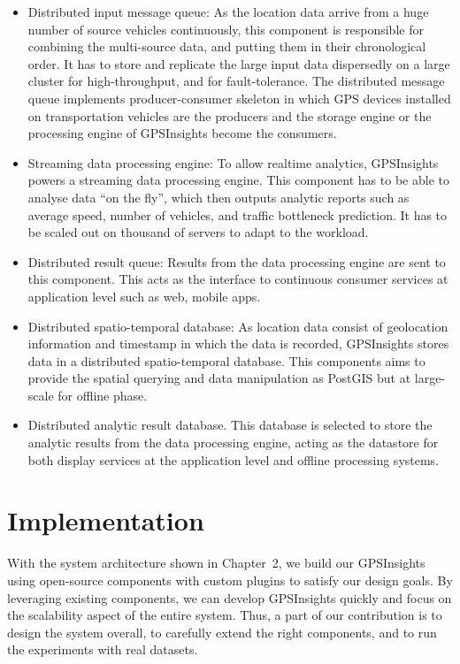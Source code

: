 \documentclass{acm_proc_article-sp}
\begin{document}
\begin{itemize}
\item 	Distributed input message queue: As the location data arrive from a huge number of source vehicles continuously, this component is responsible for combining the multi-source data, and putting them in their chronological order. It has to store and replicate the large input data dispersedly on a large cluster for high-throughput, and for fault-tolerance. The distributed message queue implements producer-consumer skeleton in which GPS devices installed on transportation vehicles are the producers and the storage engine or the processing engine of GPSInsights become the consumers.

\item  Streaming data processing engine: To allow realtime analytics, GPSInsights powers a streaming data processing engine. This component has to be able to analyse data ``on the fly'', which then outputs analytic reports such as average speed, number of vehicles, and traffic bottleneck prediction. It has to be scaled out on thousand of servers to adapt to the workload.

\item  Distributed result queue: Results from the data processing engine are sent to this component. This acts as the interface to continuous consumer services at application level such as web, mobile apps. 

\item  Distributed spatio-temporal database: As location data consist of geolocation information and timestamp in which the data is recorded, GPSInsights stores data in a distributed spatio-temporal database. This components aims to provide the spatial querying and data manipulation as PostGIS but at large-scale for offline phase. 

\item  Distributed analytic result database. This database is selected to store the analytic results from the data processing engine, acting as the datastore for both display services at the application level and offline processing systems. 

\end{itemize}


\section{Implementation} 

With the system architecture shown in Chapter~2, we build our GPSInsights using open-source components with custom plugins to satisfy our design goals. By leveraging existing components, we can develop GPSInsights quickly and focus on the scalability aspect of the entire system. Thus, a part of our contribution is to design the system overall, to carefully extend the right components, and to run the experiments with real datasets.  
\end{document}
